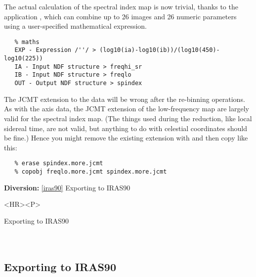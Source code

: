    The actual calculation of the spectral index map is now trivial,
   thanks to the application
{\tt {}},
   which can combine up to 26 images and 26 numeric parameters using a
   user-specified mathematical expression.

\begin{verbatim}
   % maths
   EXP - Expression /''/ > (log10(ia)-log10(ib))/(log10(450)-log10(225))
   IA - Input NDF structure > freqhi_sr
   IB - Input NDF structure > freqlo
   OUT - Output NDF structure > spindex
\end{verbatim}

\begin{latexonly}
\begin{center}
\leavevmode\epsfysize=80mm
\end{center}
\end{latexonly}

   The JCMT extension to the data
   will be wrong after the re-binning operations. As with the axis data,
   the JCMT extension of the low-frequency map are largely valid
   for the spectral index map. (The things used during the reduction,
   like local sidereal time, are not valid, but anything to do with
   celestial coordinates should be fine.) Hence you might remove the
   existing extension with
{\tt {}}
   and then copy like this:

\begin{verbatim}
   % erase spindex.more.jcmt
   % copobj freqlo.more.jcmt spindex.more.jcmt
\end{verbatim}

\begin{latexonly}
{\bf Diversion:} \ref{iras90} Exporting to IRAS90\\
\end{latexonly}

\begin{htmlonly}
\begin{rawhtml} <HR><P> \end{rawhtml}
{\bf {}} Exporting to IRAS90\\
{\bf {}}\\
{\bf {}}\\
\end{htmlonly}


\subsection{\label{iras90}Exporting to IRAS90}

